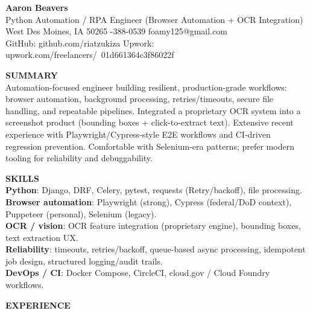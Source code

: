 \documentclass[10pt]{article}
\begin{document}
{\LARGE \textbf{Aaron Beavers}}\\
Python Automation / RPA Engineer (Browser Automation + OCR Integration)\\

West Des Moines, IA 50265 \;\;\textbar\;-388-0539 \;\;\textbar\;\; foamy125@gmail.com\\
GitHub: github.com/riatzukiza \;\;\textbar\;\; Upwork: upwork.com/freelancers/~01d661364c3f86022f

\vspace{6pt}
\textbf{SUMMARY}\\
Automation-focused engineer building resilient, production-grade workflows: browser automation, background processing, retries/timeouts, secure file handling, and repeatable pipelines. Integrated a proprietary OCR system into a screenshot product (bounding boxes + click-to-extract text). Extensive recent experience with Playwright/Cypress-style E2E workflows and CI-driven regression prevention. Comfortable with Selenium-era patterns; prefer modern tooling for reliability and debuggability.

\vspace{2pt}
\textbf{SKILLS}\\
\textbf{Python}: Django, DRF, Celery, pytest, requests (Retry/backoff), file processing.\\
\textbf{Browser automation}: Playwright (strong), Cypress (federal/DoD context), Puppeteer (personal), Selenium (legacy).\\
\textbf{OCR / vision}: OCR feature integration (proprietary engine), bounding boxes, text extraction UX.\\
\textbf{Reliability}: timeouts, retries/backoff, queue-based async processing, idempotent job design, structured logging/audit trails.\\
\textbf{DevOps / CI}: Docker Compose, CircleCI, cloud.gov / Cloud Foundry workflows.

\vspace{6pt}
\textbf{EXPERIENCE}\\
\end{document}
